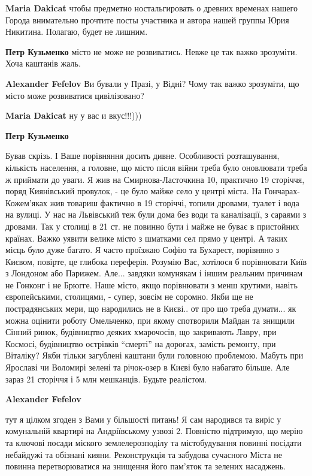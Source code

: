 \begin{itemize}
\begin{itemize}
\begin{itemize}
\textbf{Maria Dakicat} чтобы предметно ностальгировать о древних временах нашего Города внимательно прочтите посты участника и автора нашей группы Юрия Никитина. Полагаю, будет не лишним.

\textbf{Петр Кузьменко} місто не може не розвиватись. Невже це так важко зрозуміти. Хоча каштанів жаль.

\textbf{Alexander Fefelov} Ви бували у Празі, у Відні? Чому так важко зрозуміти, що місто може розвиватися цивілізовано?

\textbf{Maria Dakicat} ну у вас и вкус!!!)))

\textbf{Петр Кузьменко} 

Бував скрізь. І Ваше порівняння досить дивне. Особливості розташування,
кількість населення, а головне, що місто після війни треба було оновлювати
треба ж приймати до уваги. Я жив на Смирнова-Ласточкина 10, практично 19
сторіччя, поряд Киянівський провулок, - це було майже село у центрі міста. На
Гончарах- Кожем'яках жив товариш фактично в 19 сторіччі, топили дровами, туалет
і вода на вулиці. У нас на Львівський теж були дома без води та каналізації, з
сараями з дровами. Так у столиці в 21 ст. не повинно бути і майже не буває в
пристойних країнах. Важко уявити велике місто з шматками сел прямо у центрі. А
таких місць було дуже багато. Я часто проїзжаю Софію та Бухарест, порівняно з
Києвом, повірте, це глибока переферія. Розумію Вас, хотілося б порівнювати Київ
з Лондоном або Парижем. Але... завдяки комунякам і іншим реальним причинам не
Гонконг і не Брюгге. Наше місто, якщо порівнювати з менш крутими, навіть
європейськими, столицями, - супер, зовсім не соромно. Якби ще не пострадянських
мери, що народились не в Києві.. от про що треба думати... як можна оцінити
роботу Омельченко, при якому спотворили Майдан та знищили Сінний ринок,
будівництво деяких хмарочосів, що закривають Лавру, при Космосі, будівництво
острівків \enquote{смерті} на дорогах, замість ремонту, при Віталіку? Якби тільки
загублені каштани були головною проблемою. Мабуть при Ярославі чи Воломирі
зелені та річок-озер в Києві було набагато більше. Але зараз 21 сторіччя і 5
млн мешканців. Будьте реалістом.

\textbf{Alexander Fefelov} 

тут я цілком згоден з Вами у більшості питань! Я сам народився та виріс у
комунальній квартирі на Андріївському узвозі 2. Повністю підтримую, що мерію та
ключові посади міского землелерозподілу та містобудування повинні посідати
небайдужі та обізнані кияни. Реконструкція та забудова сучасного Міста не
повинна перетворюватися на знищення його пам'яток та зелених насаджень.



\end{itemize}
\end{itemize}
\end{itemize}
